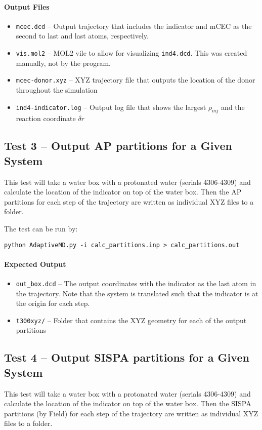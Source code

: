 \documentclass{article}
\begin{document}
\paragraph{Output Files}
\begin{itemize}
\item \texttt{mcec.dcd} -- Output trajectory that includes the indicator and mCEC as the second to last and last atoms, respectively.
\item \texttt{vis.mol2} -- MOL2 vile to allow for visualizing \texttt{ind4.dcd}. This was created manually, not by the program.
\item \texttt{mcec-donor.xyz} -- XYZ trajectory file that outputs the location of the donor throughout the simulation
\item \texttt{ind4-indicator.log} -- Output log file that shows the largest $\rho_{mj}$ and the reaction coordinate $\delta r$
\end{itemize}

\subsection{Test 3 -- Output AP partitions for a Given System}
This test will take a water box with a protonated water (serials 4306-4309) and calculate the location of the indicator on top of the water box.
Then the AP partitions for each step of the trajectory are written as individual XYZ files to a folder.

The test can be run by:

\texttt{python AdaptiveMD.py -i calc\_partitions.inp > calc\_partitions.out}

\paragraph{Expected Output}
\begin{itemize}
\item \texttt{out\_box.dcd} -- The output coordinates with the indicator as the last atom in the trajectory.
Note that the system is translated such that the indicator is at the origin for each step.
\item \texttt{t300xyz/} -- Folder that contains the XYZ geometry for each of the output partitions
\end{itemize}

\subsection{Test 4 -- Output SISPA partitions for a Given System}
This test will take a water box with a protonated water (serials 4306-4309) and calculate the location of the indicator on top of the water box.
Then the SISPA partitions (by Field\cite{Field2017}) for each step of the trajectory are written as individual XYZ files to a folder.
\end{document}
